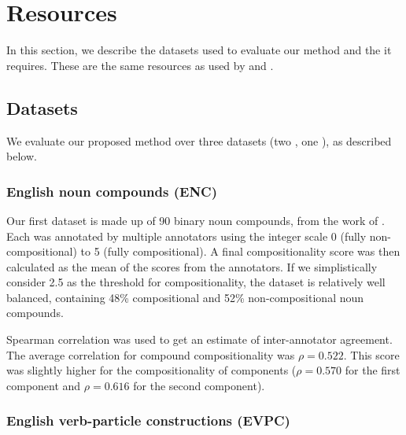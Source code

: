 \documentclass[output=paper,modfonts,nonflat]{langsci/langscibook}
\begin{document}
\section{Resources}

In this section, we describe the datasets used to evaluate our method
and the  it requires. These are the same
resources as used by \cite{salehi2013} and
\cite{DBLP:conf/eacl/SalehiCB14}.

\subsection{Datasets}
\label{salehi:sec:dataset}

We evaluate our proposed method over three datasets (two , one
), as described below.

\subsubsection{English noun compounds (ENC)}
\label{sec:enc}

Our first dataset is made up of 90 binary  noun compounds, from
the work of \citet{reddy2011a}. Each  was annotated by
multiple annotators using the integer scale 0 (fully
non-compositional) to 5 (fully compositional). A final
compositionality score was then calculated as the mean of the scores
from the annotators. If we simplistically consider 2.5 as the
threshold for compositionality, the dataset is relatively well
balanced, containing 48\% compositional and 52\% non-compositional
noun compounds. 

Spearman correlation was used to get an estimate of inter-annotator
agreement.  The average correlation for compound compositionality was
$\rho = 0.522$. This score was slightly higher for the compositionality of
components ($\rho = 0.570$ for the first component and $\rho = 0.616$ for the second
component).




\subsubsection{English verb-particle constructions (EVPC)}
\label{sec:evpc}
\end{document}

